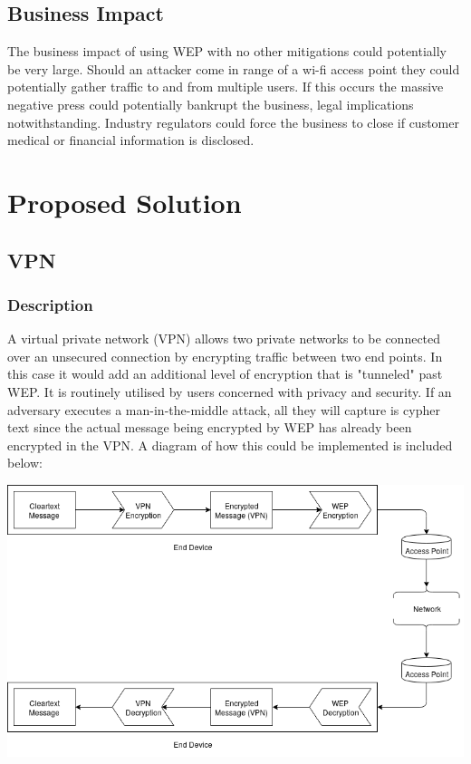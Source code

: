 \documentclass[12pt]{article}
\begin{document}
\subsection{Business Impact}
The business impact of using WEP with no other mitigations could potentially be very large. Should an attacker come in range of a wi-fi access point they could potentially gather traffic to and from multiple users. If this occurs the massive negative press could potentially bankrupt the business, legal implications notwithstanding. Industry regulators could force the business to close if customer medical or financial information is disclosed.

\newpage
\section{Proposed Solution}
\subsection{VPN}
\subsubsection{Description}
A virtual private network (VPN) allows two private networks to be connected over an unsecured connection by encrypting traffic between two end points. In this case it would add an additional level of encryption that is "tunneled" past WEP. It is routinely utilised by users concerned with privacy and security. If an adversary executes a man-in-the-middle attack, all they will capture is cypher text since the actual message being encrypted by WEP has already been encrypted in the VPN. A diagram of how this could be implemented is included below:

\vspace{6px}
\centerline{\includegraphics[width=0.7\linewidth]{res/vpn_example.png}}
\vspace{6px}
\end{document}
